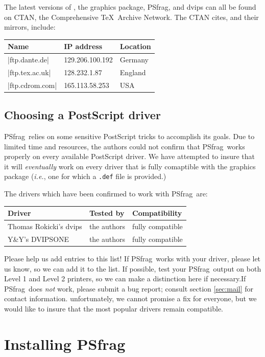 \documentclass[11pt]{ltxguide}
\makeatletter
\let\pkg\textsf
\let\fname\texttt
\newcommand{\pfg}{\pkg{PSfrag}}
\newcommand{\ie}{\emph{i.e.\@}}
\makeatother
\begin{document}
The latest versions of \LaTeXe, the \pkg{graphics} package, \pfg,
and \pkg{dvips} can all be found on CTAN, the
Comprehensive \TeX\ Archive Network. The CTAN cites, and their mirrors,
include:
\begin{center}
  \begin{tabular}{lll}
    Name & IP address & Location \\ \hline
    |ftp.dante.de| & 129.206.100.192 & Germany \\
    |ftp.tex.ac.uk| & 128.232.1.87 & England \\
    |ftp.cdrom.com| & 165.113.58.253 & USA \\
  \end{tabular}
\end{center}

\subsection{Choosing a PostScript driver}
\label{sec:compat}

\pfg\ relies on some sensitive PostScript tricks to accomplish its goals. Due
to limited time and resources, the authors could not confirm that \pfg\ works
properly on every available PostScript driver. We have attempted to insure that
it will \emph{eventually} work on every driver that is fully comaptible with
the \pkg{graphics} package (\ie, one for which a \fname{.def} file is
provided.)

The drivers which have been confirmed to work with \pfg\ are:
\begin{center}
\begin{tabular}{lll}
Driver & Tested by & Compatibility \\ \hline
Thomas Rokicki's \pkg{dvips} & the authors &
fully compatible \\
Y\&Y's \pkg{DVIPSONE} & the authors &
fully compatible
\end{tabular}
\end{center}
Please help us add entries to this list! If \pfg\ works with your driver,
please let us know, so we can add it to the list. If possible, test your \pfg\
output on both Level 1 and Level 2 printers, so we can make a distinction here
if necessary.If \pfg\ does \emph{not} work, please submit a bug report; consult
section \ref{sec:mail} for contact information. unfortunately, we cannot
promise a fix for everyone, but we would like to insure that the most popular
drivers remain compatible.

\section{Installing \pfg}
\end{document}
